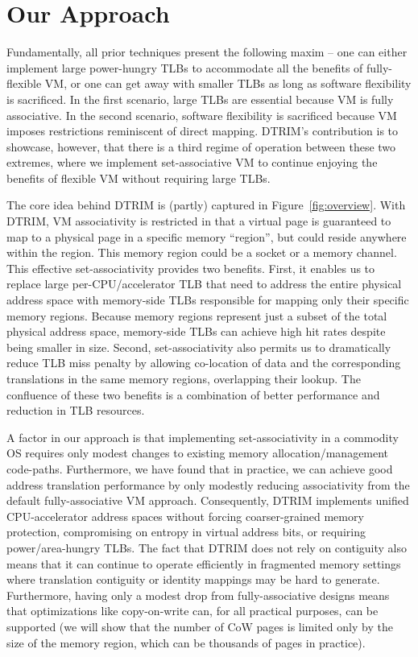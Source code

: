 \section{Our Approach}\label{our-approach}
Fundamentally, all prior techniques present the following maxim -- one
can either implement large power-hungry TLBs to accommodate all the
benefits of fully-flexible VM, or one can get away with smaller TLBs
as long as software flexibility is sacrificed. In the first scenario,
large TLBs are essential because VM is fully associative. In the
second scenario, software flexibility is sacrificed because VM imposes
restrictions reminiscent of direct mapping. DTRIM's contribution is
to showcase, however, that there is a third regime of operation
between these two extremes, where we implement set-associative VM to
continue enjoying the benefits of flexible VM without requiring large
TLBs. 

The core idea behind DTRIM is (partly) captured in Figure~\ref{fig:overview}. With
DTRIM, VM associativity is restricted in that a virtual page is
guaranteed to map to a physical page in a specific memory
``region'', but could reside anywhere within the region. This memory region could be a socket or a memory
channel. This effective set-associativity provides two
benefits. First, it enables us to replace large per-CPU/accelerator
TLB that need to address the entire physical address space with
memory-side TLBs responsible for mapping only their specific memory
regions. Because memory regions represent just a subset of the total
physical address space, memory-side TLBs can achieve high hit rates
despite being smaller in size. Second, set-associativity also permits
us to dramatically reduce TLB miss penalty by allowing co-location of data and
the corresponding translations in the same memory regions, overlapping their
lookup. The confluence of these two benefits is a combination of
better performance and reduction in TLB resources. 

A factor in our approach is that implementing set-associativity in a
commodity OS requires only modest changes to existing memory
allocation/management code-paths. Furthermore, we have found that in
practice, we can achieve good address translation performance by only
modestly reducing associativity from the default fully-associative VM
approach. Consequently, DTRIM implements unified CPU-accelerator
address spaces without forcing coarser-grained memory protection,
compromising on entropy in virtual address bits, or requiring
power/area-hungry TLBs. The fact that DTRIM does not rely on
contiguity also means that it can continue to operate efficiently in
fragmented memory settings where translation contiguity or identity
mappings may be hard to generate. Furthermore, having only a modest drop
from fully-associative designs means that optimizations like
copy-on-write can, for all practical purposes, can be supported (we will
show that the number of CoW pages is limited only by the size of the
memory region, which can be thousands of pages in practice).


